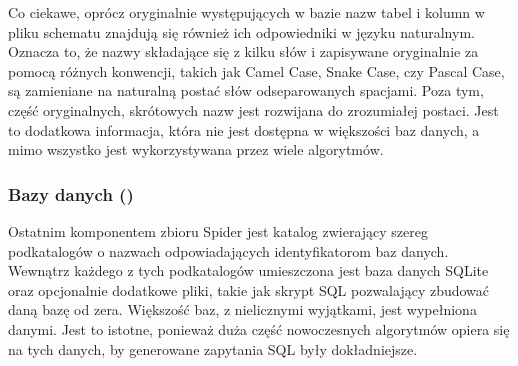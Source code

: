 Co ciekawe, oprócz oryginalnie występujących w bazie nazw tabel i kolumn w pliku schematu znajdują się również ich odpowiedniki w języku naturalnym. Oznacza to, że nazwy składające się z kilku słów i zapisywane oryginalnie za pomocą różnych konwencji, takich jak Camel Case, Snake Case, czy Pascal Case, są zamieniane na naturalną postać słów odseparowanych spacjami. Poza tym, część oryginalnych, skrótowych nazw jest rozwijana do zrozumiałej postaci. Jest to dodatkowa informacja, która nie jest dostępna w większości baz danych, a mimo wszystko jest wykorzystywana przez wiele algorytmów.



\subsubsection{Bazy danych ()}
Ostatnim komponentem zbioru Spider jest katalog  zwierający szereg podkatalogów o nazwach odpowiadających identyfikatorom baz danych. Wewnątrz każdego z tych podkatalogów umieszczona jest baza danych SQLite oraz opcjonalnie dodatkowe pliki, takie jak skrypt SQL pozwalający zbudować daną bazę od zera. Większość baz, z nielicznymi wyjątkami, jest wypełniona danymi. Jest to istotne, ponieważ duża część nowoczesnych algorytmów opiera się na tych danych, by generowane zapytania SQL były dokładniejsze.



